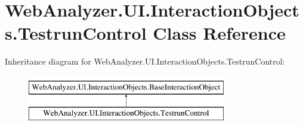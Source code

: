 \hypertarget{class_web_analyzer_1_1_u_i_1_1_interaction_objects_1_1_testrun_control}{}\section{Web\+Analyzer.\+U\+I.\+Interaction\+Objects.\+Testrun\+Control Class Reference}
\label{class_web_analyzer_1_1_u_i_1_1_interaction_objects_1_1_testrun_control}
Inheritance diagram for Web\+Analyzer.\+U\+I.\+Interaction\+Objects.\+Testrun\+Control\+:\begin{figure}[H]
\begin{center}
\leavevmode
\includegraphics[height=2.000000cm]{class_web_analyzer_1_1_u_i_1_1_interaction_objects_1_1_testrun_control}
\end{center}
\end{figure}
